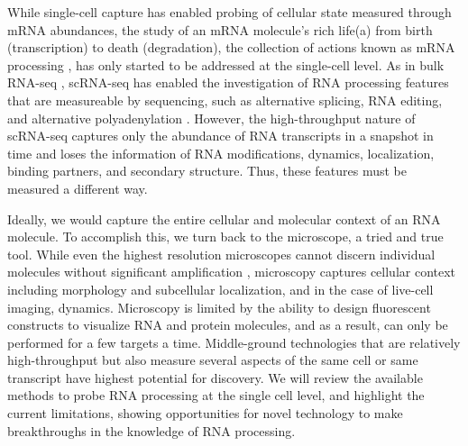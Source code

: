 While single-cell capture has enabled probing of cellular state measured through mRNA abundances, the study of an mRNA molecule's rich life\linebreak (a) from birth (transcription) to death (degradation), the collection of actions known as mRNA processing  \cite{Blanc2003-wk,Gerstberger2014-hj,Yeo2016-do,Nussbacher2015-kr,Singh2015-gd}, has only started to be addressed at the single-cell level. As in bulk RNA-seq  \cite{Anders2012-fq,Kleinman2012-td,Lianoglou2013-pc,Nishikura2010-dk,Park2012-av,Peng2012-ru,Shen2014-zq,Wang2008-xh}, scRNA-seq has enabled the investigation of RNA processing features that are measureable by sequencing, such as alternative splicing, RNA editing, and alternative polyadenylation  \cite{Karlsson2017-wy,Marinov2014-iw,Picardi2017-bv,Shalek2013-ez,Velten2015-zd,Welch2016-it}. However, the high-throughput nature of scRNA-seq captures only the abundance of RNA transcripts in a snapshot in time and loses the information of RNA modifications, dynamics, localization, binding partners, and secondary structure. Thus, these features must be measured a different way.

Ideally, we would capture the entire cellular and molecular context of an RNA molecule. To accomplish this, we turn back to the microscope, a tried and true tool. While even the highest resolution microscopes cannot discern individual molecules without significant amplification  \cite{Femino1998-ws,Raj2009-ni}, microscopy captures cellular context including morphology and subcellular localization, and in the case of live-cell imaging, dynamics. Microscopy is limited by the ability to design fluorescent constructs to visualize RNA and protein molecules, and as a result, can only be performed for a few targets a time. Middle-ground technologies that are relatively high-throughput but also measure several aspects of the same cell or same transcript  \cite{Gierahn2017-ko,Macaulay2017-tb} have highest potential for discovery.
We will review the available methods to probe RNA processing at the single cell level, and highlight the current limitations, showing opportunities for novel technology to make breakthroughs in the knowledge of RNA processing.

